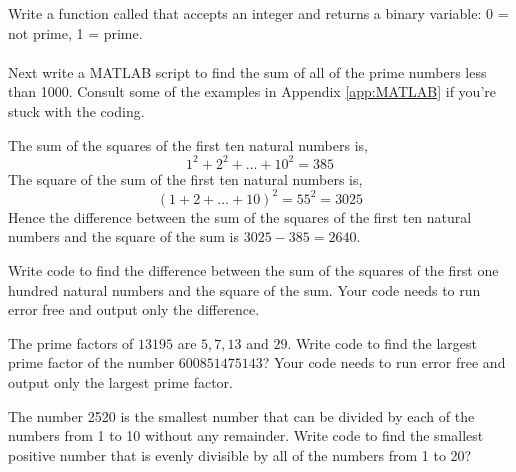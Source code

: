 \begin{problem}
    Write a function called  that accepts an integer and returns a
    binary variable: 0 = not prime, 1 = prime.\\
     \\
    Next write a MATLAB script to find the sum of all of the prime numbers less than 1000.
    Consult some of the examples in Appendix \ref{app:MATLAB} if you're stuck with
    the coding.
\end{problem}




\begin{problem}
    The sum of the squares of the first ten natural numbers is,
    \[ 1^2 + 2^2 + \dots + 10^2 = 385 \]
    The square of the sum of the first ten natural numbers is,
    \[ (1 + 2 + \dots + 10)^2 = 55^2 = 3025 \]
    Hence the difference between the sum of the squares of the first ten natural numbers
    and the square of the sum is $3025 - 385 = 2640$.

    Write code to find the difference between the sum of the squares of the first one
    hundred natural numbers and the square of the sum.  Your code needs to run error free
    and output only the difference.  
\end{problem}

\begin{problem}
    The prime factors of $13195$ are $5, 7, 13$ and $29$.  Write
    code to find the largest prime factor of the number $600851475143$? Your code needs to
    run error free and output only the largest prime factor. 
\end{problem}


\begin{problem}
    The number 2520 is the smallest number that can be divided by each of the
    numbers from 1 to 10 without any remainder.  Write code to find the smallest positive
    number that is evenly divisible by all of the numbers from 1 to 20?
\end{problem}


